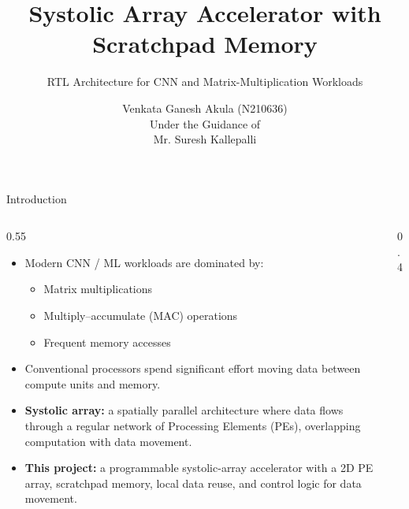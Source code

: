 \documentclass[aspectratio=169,10pt]{beamer}
\title{\textbf{Systolic Array Accelerator with Scratchpad Memory}}
\subtitle{RTL Architecture for CNN and Matrix-Multiplication Workloads}
\author{Venkata Ganesh Akula (N210636) \\ \vspace{0.2cm} \small{Under the Guidance of  \\ Mr. Suresh Kallepalli}}
\institute{Department of Electronics and Communication Engineering \\ RGUKT Nuzvid}
\date{}
\begin{document}
\begin{frame}[plain]
  \titlepage
\end{frame}

\begin{frame}{Introduction}
  \begin{columns}[T]
    \begin{column}{0.55\textwidth}
      \begin{itemize}
        \item Modern CNN / ML workloads are dominated by:
        \begin{itemize}
          \item Matrix multiplications
          \item Multiply--accumulate (MAC) operations
          \item Frequent memory accesses
        \end{itemize}
        \item Conventional processors spend significant effort moving data between compute units and memory.
        \item \textbf{Systolic array:} a spatially parallel architecture where data flows through a regular network of Processing Elements (PEs), overlapping computation with data movement.
        \item \textbf{This project:} a programmable systolic-array accelerator with a 2D PE array, scratchpad memory, local data reuse, and control logic for data movement.
      \end{itemize}
    \end{column}
    \begin{column}{0.4\textwidth}
      \centering
    \end{column}
  \end{columns}
\end{frame}
\end{document}
